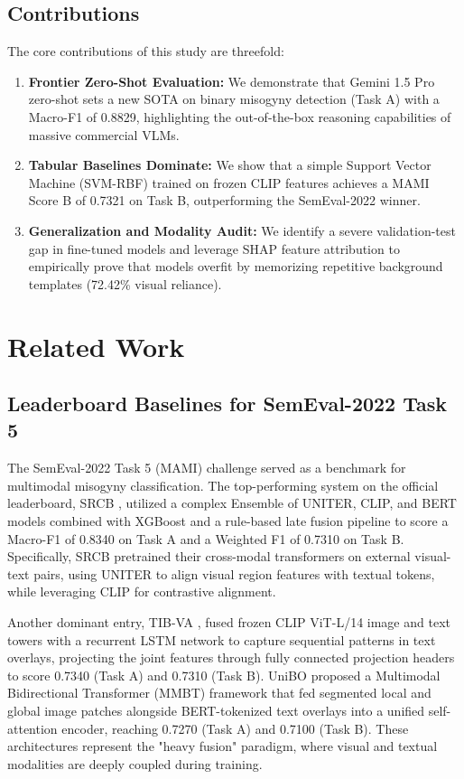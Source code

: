 \documentclass[11pt]{article}
\begin{document}
\subsection{Contributions}
The core contributions of this study are threefold:
\begin{enumerate}
    \item \textbf{Frontier Zero-Shot Evaluation:} We demonstrate that Gemini 1.5 Pro zero-shot sets a new SOTA on binary misogyny detection (Task A) with a Macro-F1 of 0.8829, highlighting the out-of-the-box reasoning capabilities of massive commercial VLMs.
    \item \textbf{Tabular Baselines Dominate:} We show that a simple Support Vector Machine (SVM-RBF) trained on frozen CLIP features achieves a MAMI Score B of 0.7321 on Task B, outperforming the SemEval-2022 winner.
    \item \textbf{Generalization and Modality Audit:} We identify a severe validation-test gap in fine-tuned models and leverage SHAP feature attribution to empirically prove that models overfit by memorizing repetitive background templates (72.42\% visual reliance).
\end{enumerate}

\section{Related Work}
\label{sec:related_work}

\subsection{Leaderboard Baselines for SemEval-2022 Task 5}
The SemEval-2022 Task 5 (MAMI) challenge served as a benchmark for multimodal misogyny classification. The top-performing system on the official leaderboard, SRCB \cite{zhang2022srcb}, utilized a complex Ensemble of UNITER, CLIP, and BERT models combined with XGBoost and a rule-based late fusion pipeline to score a Macro-F1 of 0.8340 on Task A and a Weighted F1 of 0.7310 on Task B. Specifically, SRCB pretrained their cross-modal transformers on external visual-text pairs, using UNITER to align visual region features with textual tokens, while leveraging CLIP for contrastive alignment.

Another dominant entry, TIB-VA \cite{hakimov2022tibva}, fused frozen CLIP ViT-L/14 image and text towers with a recurrent LSTM network to capture sequential patterns in text overlays, projecting the joint features through fully connected projection headers to score 0.7340 (Task A) and 0.7310 (Task B). UniBO \cite{muti2022unibo} proposed a Multimodal Bidirectional Transformer (MMBT) framework that fed segmented local and global image patches alongside BERT-tokenized text overlays into a unified self-attention encoder, reaching 0.7270 (Task A) and 0.7100 (Task B). These architectures represent the "heavy fusion" paradigm, where visual and textual modalities are deeply coupled during training.
\end{document}
